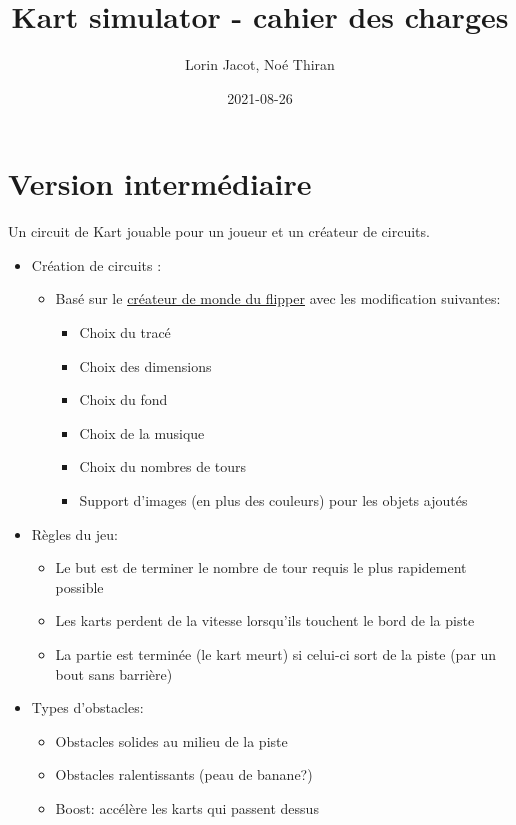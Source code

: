\documentclass{article}
\title{Kart simulator - cahier des charges}
\date{2021-08-26}
\author{Lorin Jacot, Noé Thiran}
\begin{document}
\maketitle

\section{Version intermédiaire}

Un circuit de Kart jouable pour un joueur et un créateur de circuits.

\begin{itemize}
    \item Création de circuits :
          \begin{itemize}
              \item Basé sur le \href{https://lj44.ch/creator/flipper}{créateur de monde du flipper} avec les modification suivantes: \begin{itemize}
                        \item Choix du tracé
                        \item Choix des dimensions
                        \item Choix du fond
                        \item Choix de la musique
                        \item Choix du nombres de tours
                        \item Support d'images (en plus des couleurs) pour les objets ajoutés
                    \end{itemize}
          \end{itemize}
    \item Règles du jeu: \begin{itemize}
        \item Le but est de terminer le nombre de tour requis le plus rapidement possible
        \item Les karts perdent de la vitesse lorsqu'ils touchent le bord de la piste
        \item La partie est terminée (le kart meurt) si celui-ci sort de la piste (par un bout sans barrière)
    \end{itemize}
    \item Types d'obstacles:\begin{itemize}
        \item Obstacles solides au milieu de la piste
        \item Obstacles ralentissants (peau de banane?)
        \item Boost: accélère les karts qui passent dessus

\end{itemize}
\end{itemize}
\end{document}
